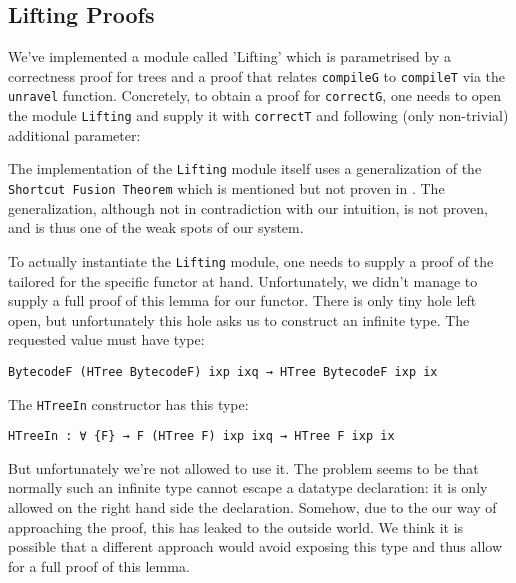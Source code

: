\documentclass[a4paper]{article}
\begin{document}
        \subsection{Lifting Proofs}
        
        
        We've implemented a module called 'Lifting' which is parametrised by a correctness proof for trees and a proof that relates \texttt{compileG} 
        to \texttt{compileT} via the \texttt{unravel} function. Concretely, to obtain a proof for \texttt{correctG}, one needs to open the module 
        \texttt{Lifting} and supply it with \texttt{correctT} and following (only non-trivial) additional parameter:
        
        
        The implementation of the \texttt{Lifting} module itself uses a generalization of the \texttt{Shortcut Fusion Theorem} which is mentioned but not proven in \cite{compiler-correctness-structured-graphs}.
        The generalization, although not in contradiction with our intuition, is not proven, and is thus one of the weak spots of our system.
        
        To actually instantiate the \texttt{Lifting} module, one needs to supply a proof of the  tailored for the specific functor at hand. 
        Unfortunately, we didn't manage to supply a full proof of this lemma for our  functor. There is only tiny hole left open, but 
        unfortunately this hole asks us to construct an infinite type. The requested value must have type:
        \begin{verbatim}
BytecodeF (HTree BytecodeF) ixp ixq → HTree BytecodeF ixp ix
        \end{verbatim}
        
        The \texttt{HTreeIn} constructor has this type:
        
        \begin{verbatim}
HTreeIn : ∀ {F} → F (HTree F) ixp ixq → HTree F ixp ix
        \end{verbatim}
        
        But unfortunately we're not allowed to use it. The problem seems to be that normally such an infinite type cannot escape a datatype declaration: 
        it is only allowed on the right hand side the declaration. Somehow, due to the our way of approaching the proof, this has leaked to the outside world.
        We think it is possible that a different approach would avoid exposing this type and thus allow for a full proof of this lemma.
\end{document}
